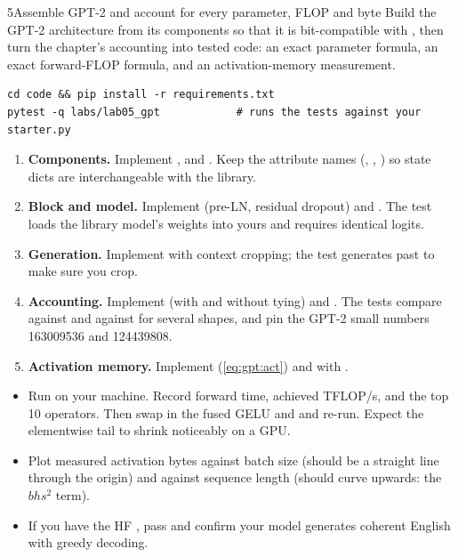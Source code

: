 \begin{labbox}{5}{Assemble GPT-2 and account for every parameter, FLOP and byte}
Build the GPT-2 architecture from its components so that it is bit-compatible with
, then turn the chapter's accounting into tested code: an exact
parameter formula, an exact forward-FLOP formula, and an activation-memory measurement.

\begin{lstlisting}[style=shell]
cd code && pip install -r requirements.txt
pytest -q labs/lab05_gpt            # runs the tests against your starter.py
\end{lstlisting}

\begin{enumerate}
\item \textbf{Components.} Implement ,  and
  . Keep the attribute names (, ,
  ) so state dicts are interchangeable with the library.
\item \textbf{Block and model.} Implement  (pre-LN, residual dropout)
  and . The test loads the library model's weights into yours and requires
  identical logits.
\item \textbf{Generation.} Implement  with context cropping; the test generates
  past  to make sure you crop.
\item \textbf{Accounting.} Implement  (with and without tying) and
  . The tests compare against  and against
   for several shapes, and pin the GPT-2 small numbers \num{163009536} and
  \num{124439808}.
\item \textbf{Activation memory.} Implement  (\cref{eq:gpt:act})
  and  with .
\end{enumerate}

\begin{itemize}
\item Run  on your machine.
  Record forward time, achieved TFLOP/s, and the top 10 operators. Then swap in the fused GELU and
   and re-run. Expect the elementwise tail to shrink noticeably on a GPU.
\item Plot measured activation bytes against batch size (should be a straight line through the
  origin) and against sequence length (should curve upwards: the $bhs^2$ term).
\item If you have the HF  , pass  and confirm
  your model generates coherent English with greedy decoding.
\end{itemize}


\end{labbox}
